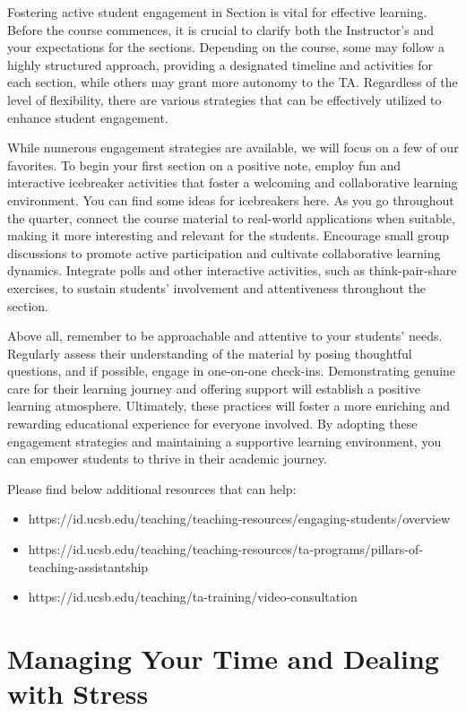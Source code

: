\documentclass[
  letterpaper,
  DIV=11,
  numbers=noendperiod]{scrreprt}
\begin{document}
Fostering active student engagement in Section is vital for effective
learning. Before the course commences, it is crucial to clarify both the
Instructor's and your expectations for the sections. Depending on the
course, some may follow a highly structured approach, providing a
designated timeline and activities for each section, while others may
grant more autonomy to the TA. Regardless of the level of flexibility,
there are various strategies that can be effectively utilized to enhance
student engagement.

While numerous engagement strategies are available, we will focus on a
few of our favorites. To begin your first section on a positive note,
employ fun and interactive icebreaker activities that foster a welcoming
and collaborative learning environment. You can find some ideas for
icebreakers here. As you go throughout the quarter, connect the course
material to real-world applications when suitable, making it more
interesting and relevant for the students. Encourage small group
discussions to promote active participation and cultivate collaborative
learning dynamics. Integrate polls and other interactive activities,
such as think-pair-share exercises, to sustain students' involvement and
attentiveness throughout the section.

Above all, remember to be approachable and attentive to your students'
needs. Regularly assess their understanding of the material by posing
thoughtful questions, and if possible, engage in one-on-one check-ins.
Demonstrating genuine care for their learning journey and offering
support will establish a positive learning atmosphere. Ultimately, these
practices will foster a more enriching and rewarding educational
experience for everyone involved. By adopting these engagement
strategies and maintaining a supportive learning environment, you can
empower students to thrive in their academic journey.

Please find below additional resources that can help:

\begin{itemize}
\item
  https://id.ucsb.edu/teaching/teaching-resources/engaging-students/overview
\item
  https://id.ucsb.edu/teaching/teaching-resources/ta-programs/pillars-of-teaching-assistantship
\item
  https://id.ucsb.edu/teaching/ta-training/video-consultation
\end{itemize}

\hypertarget{managing-your-time-and-dealing-with-stress}{%
\chapter{Managing Your Time and Dealing with
Stress}\label{managing-your-time-and-dealing-with-stress}}
\end{document}
